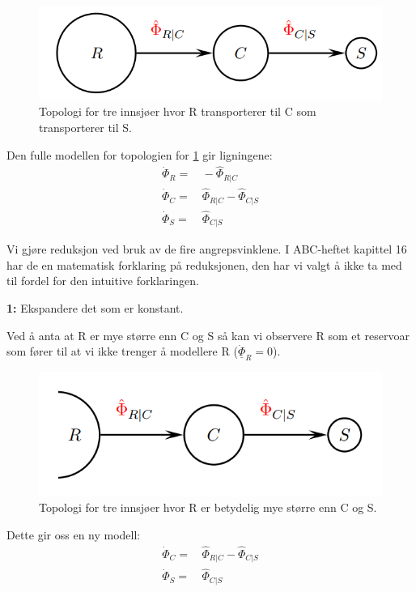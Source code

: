 \begin{figure}[H]
    \centering
    \includegraphics[scale=0.5]{Figures/time_scale_topo}
    \caption{Topologi for tre innsjøer hvor R transporterer til C som transporterer til S.}
    \label{fig:time_scale_topo}
\end{figure}

Den fulle modellen for topologien for \cref{fig:time_scale_topo} gir ligningene:
\begin{align}
    \dot{\Phi}_{R} =&\, -\hat{\Phi}_{R|C} \\
    \dot{\Phi}_C =&\, \hat{\Phi}_{R|C} - \hat{\Phi}_{C|S}\\
    \dot{\Phi}_S =&\, \hat{\Phi}_{C|S}
\end{align}

Vi gjøre reduksjon ved bruk av de fire angrepsvinklene. I ABC-heftet kapittel 16 har de en matematisk forklaring på reduksjonen, den har vi valgt å ikke ta med til fordel for den intuitive forklaringen.  

\begin{center}
    \textbf{1:} Ekspandere det som er konstant.
\end{center}
Ved å anta at R er mye større enn C og S så kan vi observere R som et reservoar som fører til at vi ikke trenger å modellere R ($\underline{\dot{\Phi}}_R = 0$).

\begin{figure}[H]
    \centering
    \includegraphics[scale=0.5]{Figures/time_scale_topo1.png}
    \caption{Topologi for tre innsjøer hvor R er betydelig mye større enn C og S.}
    \label{fig:time_scale_topo1}
\end{figure}
Dette gir oss en ny modell:
\begin{align}
    \dot{\Phi}_C =&\, \hat{\Phi}_{R|C} - \hat{\Phi}_{C|S}\\
    \dot{\Phi}_S =&\, \hat{\Phi}_{C|S}
\end{align}


